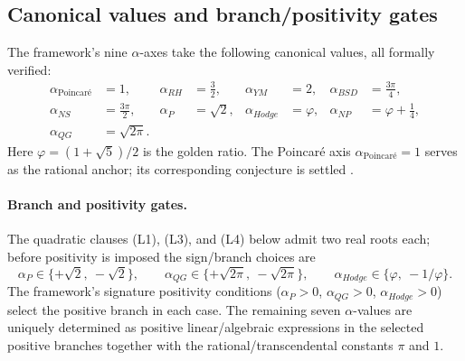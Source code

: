 \documentclass[11pt,a4paper]{amsart}
\theoremstyle{plain}
\theoremstyle{definition}
\newcommand{\aP}{\alpha_{P}}
\newcommand{\aNP}{\alpha_{NP}}
\newcommand{\aRH}{\alpha_{RH}}
\newcommand{\aYM}{\alpha_{YM}}
\newcommand{\aNS}{\alpha_{NS}}
\newcommand{\aBSD}{\alpha_{BSD}}
\newcommand{\aHodge}{\alpha_{Hodge}}
\newcommand{\aPoinc}{\alpha_{\text{Poincar\'e}}}
\newcommand{\aQG}{\alpha_{QG}}
\newcommand{\golden}{\varphi}
\begin{document}
\subsection{Canonical values and branch/positivity gates}
The framework's nine $\alpha$-axes take the following canonical values, all
formally verified:
\begin{equation}
\label{eq:nine-axes}
\begin{aligned}
\aPoinc &= 1, & \aRH &= \tfrac{3}{2}, & \aYM &= 2, & \aBSD &= \tfrac{3\pi}{4}, \\
\aNS &= \tfrac{3\pi}{2}, & \aP &= \sqrt{2}, & \aHodge &= \golden, & \aNP &= \golden + \tfrac{1}{4}, \\
\aQG &= \sqrt{2\pi}.
\end{aligned}
\end{equation}
Here $\golden = (1+\sqrt 5)/2$ is the golden ratio. The Poincar\'e axis
$\aPoinc = 1$ serves as the rational anchor; its corresponding conjecture
is settled \cite{perelman2003,hamilton1982,morgan2007}.

\paragraph{Branch and positivity gates.} The quadratic clauses (L1), (L3),
and (L4) below admit two real roots each; before positivity is imposed the
sign/branch choices are
\[
\aP \in \{+\sqrt 2,\ -\sqrt 2\},\qquad
\aQG \in \{+\sqrt{2\pi},\ -\sqrt{2\pi}\},\qquad
\aHodge \in \bigl\{\golden,\ -1/\golden\bigr\}.
\]
The framework's signature positivity conditions
($\aP>0$, $\aQG>0$, $\aHodge>0$) select the positive branch in each case.
The remaining seven $\alpha$-values are uniquely determined as positive
linear/algebraic expressions in the selected positive branches together
with the rational/transcendental constants $\pi$ and $1$.
\end{document}
